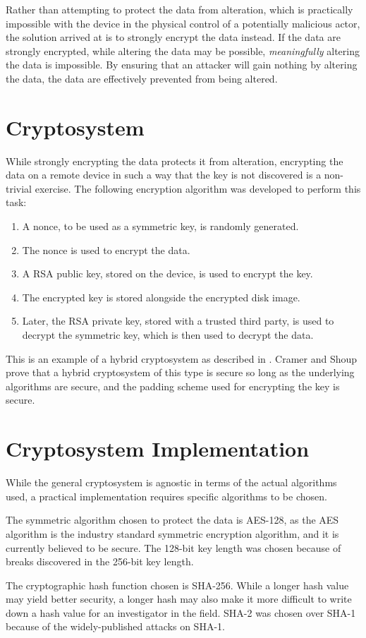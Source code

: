 Rather than attempting to protect the data from alteration, which is practically impossible with the device
in the physical control of a potentially malicious actor, the solution arrived at is to strongly encrypt
the data instead. If the data are strongly encrypted, while altering the data may be possible, 
\emph{meaningfully} altering the data is impossible. By ensuring that an attacker will gain nothing by
altering the data, the data are effectively prevented from being altered.

\section{Cryptosystem}

While strongly encrypting the data protects it from alteration, encrypting the data on a remote device in such
a way that the key is not discovered is a non-trivial exercise. The following encryption algorithm was developed
to perform this task:

\begin{enumerate}
  \item A nonce, to be used as a symmetric key, is randomly generated.
  \item The nonce is used to encrypt the data.
  \item A RSA public key, stored on the device, is used to encrypt the key.
  \item The encrypted key is stored alongside the encrypted disk image.
  \item Later, the RSA private key, stored with a trusted third party, is
        used to decrypt the symmetric key, which is then used to decrypt
        the data.
\end{enumerate}

This is an example of a hybrid cryptosystem as described in \cite{cramer2004}. Cramer and Shoup prove that a hybrid cryptosystem of
this type is secure so long as the underlying algorithms are secure, and the padding scheme used for encrypting the key is secure.

\section{Cryptosystem Implementation}

While the general cryptosystem is agnostic in terms of the actual algorithms used, a practical implementation requires specific
algorithms to be chosen.

The symmetric algorithm chosen to protect the data is AES-128, as the AES algorithm is the industry standard symmetric encryption
algorithm, and it is currently believed to be secure. The 128-bit key length was chosen because of breaks discovered in the 256-bit
key length.\cite{Biryukov2009}

The cryptographic hash function chosen is SHA-256. While a longer hash value may yield better security, a longer hash may also make
it more difficult to write down a hash value for an investigator in the field. SHA-2 was chosen over SHA-1 because of the widely-published
attacks on SHA-1.


